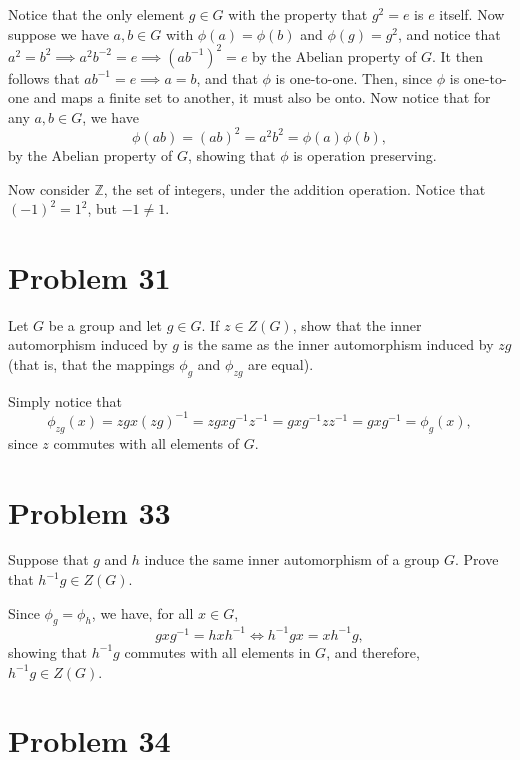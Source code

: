 \documentclass[12pt]{article}
\newcommand{\Z}{\mathbb{Z}}
\begin{document}
Notice that the only element $g\in G$ with the property that $g^2=e$ is $e$ itself.
Now suppose we have $a,b\in G$ with $\phi(a)=\phi(b)$ and $\phi(g)=g^2$, and
notice that $a^2=b^2\implies a^2b^{-2}=e\implies (ab^{-1})^2=e$ by the Abelian property of $G$.
It then follows that $ab^{-1}=e\implies a=b$, and that $\phi$ is one-to-one.
Then, since $\phi$ is one-to-one and maps a finite set to another, it must also be onto.
Now notice that for any $a,b\in G$, we have
\begin{equation*}
\phi(ab)=(ab)^2=a^2b^2=\phi(a)\phi(b),
\end{equation*}
by the Abelian property of $G$, showing that $\phi$ is operation preserving.

Now consider $\Z$, the set of integers, under the addition operation.
Notice that $(-1)^2=1^2$, but $-1\neq 1$.

\section*{Problem 31}

Let $G$ be a group and let $g\in G$.  If $z\in Z(G)$, show that the inner automorphism induced by $g$ is the same as the inner
automorphism induced by $zg$ (that is, that the mappings $\phi_g$ and $\phi_{zg}$ are equal).

Simply notice that
\begin{equation*}
\phi_{zg}(x)=zgx(zg)^{-1}=zgxg^{-1}z^{-1}=gxg^{-1}zz^{-1}=gxg^{-1}=\phi_g(x),
\end{equation*}
since $z$ commutes with all elements of $G$.

\section*{Problem 33}

Suppose that $g$ and $h$ induce the same inner automorphism of a group $G$.
Prove that $h^{-1}g\in Z(G)$.

Since $\phi_g=\phi_h$, we have, for all $x\in G$,
\begin{equation*}
gxg^{-1}=hxh^{-1} \iff h^{-1}gx = xh^{-1}g,
\end{equation*}
showing that $h^{-1}g$ commutes with all elements in $G$, and therefore, $h^{-1}g\in Z(G)$.

\section*{Problem 34}
\end{document}
